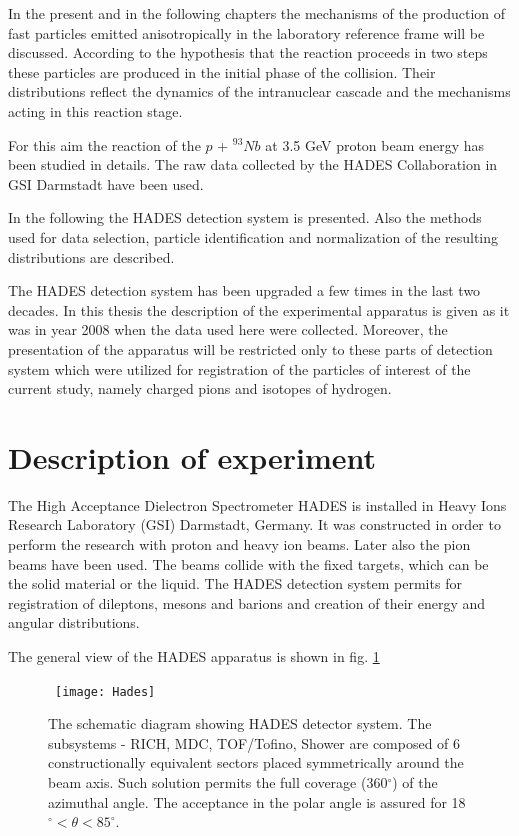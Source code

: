 In the present and in the following chapters the mechanisms of the production of fast particles emitted anisotropically in the laboratory reference frame will be discussed.
According to the hypothesis that the reaction proceeds in two steps these particles are produced in the initial phase of the collision. 
Their distributions reflect the dynamics of the intranuclear cascade and the mechanisms acting in this reaction stage.

For this aim the reaction of the $p$ + $^{93}$$Nb$ at 3.5 GeV proton beam energy has been studied in details. 
The raw data collected by the HADES Collaboration \cite{AGAKISHIEV2012304,AgakishievPionP,
PhysRevC.90.054906,HADES_2014_Lambda_p_Nb,PhysRevLett.114.212301,
PhysRevC.94.025201,HADES_2014_Lambda_p_Nb,2018735} 
in GSI Darmstadt have been used.

In the following the HADES detection system is presented. Also the methods used for data selection, particle identification and normalization of the 
resulting distributions are described. 

The HADES detection system has been upgraded a few times in the last two decades. In this thesis the description of the experimental apparatus is given 
as it was in year 2008 when the data used here were collected. Moreover, the presentation of the apparatus will be restricted only 
to these parts of detection system which were utilized for registration of the particles of interest of the current study, namely charged pions and isotopes of hydrogen.

\section{Description of experiment}

The High Acceptance Dielectron Spectrometer HADES is installed in Heavy Ions Research Laboratory 
(GSI) Darmstadt, Germany.
It was constructed in order to perform the research with proton and heavy ion beams. 
Later also the pion beams have been used.
The beams collide with the fixed targets, which can be the solid material or the liquid.
The HADES detection system permits for registration of dileptons, mesons and barions  
and creation of their energy and angular distributions. 

The general view of the HADES apparatus is shown in fig. \ref{Hades}

\begin{figure}[!ht]
	\centering\
	\texttt{[image: Hades]}
	\caption{The schematic diagram showing HADES detector system.
	The subsystems - RICH, MDC, TOF/Tofino, Shower are composed of 6 constructionally 
	equivalent sectors placed symmetrically around the beam axis. 
Such solution permits the full coverage (360$^{\circ}$) of the azimuthal angle.
The acceptance in the polar angle is assured for 18$^{\circ} < \theta < 85^{\circ}$.}
	\label{Hades}
\end{figure}

